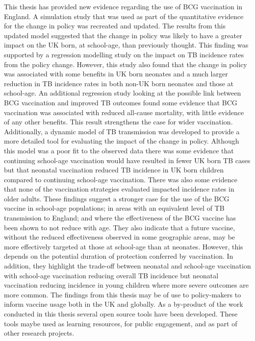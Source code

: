 \documentclass[11pt,twoside]{bristolthesis}
\begin{document}
  This thesis has provided new evidence regarding the use of BCG vaccination in England. A simulation study that was used as part of the quantitative evidence for the change in policy was recreated and updated. The results from this updated model suggested that the change in policy was likely to have a greater impact on the UK born, at school-age, than previously thought. This finding was supported by a regression modelling study on the impact on TB incidence rates from the policy change. However, this study also found that the change in policy was associated with some benefits in UK born neonates and a much larger reduction in TB incidence rates in both non-UK born neonates and those at school-age. An additional regression study looking at the possible link between BCG vaccination and improved TB outcomes found some evidence that BCG vaccination was associated with reduced all-cause mortality, with little evidence of any other benefits. This result strengthens the case for wider vaccination. Additionally, a dynamic model of TB transmission was developed to provide a more detailed tool for evaluating the impact of the change in policy. Although this model was a poor fit to the observed data there was some evidence that continuing school-age vaccination would have resulted in fewer UK born TB cases but that neonatal vaccination reduced TB incidence in UK born children compared to continuing school-age vaccination. There was also some evidence that none of the vaccination strategies evaluated impacted incidence rates in older adults. These findings suggest a stronger case for the use of the BCG vaccine in school-age populations; in areas with an equivalent level of TB transmission to England; and where the effectiveness of the BCG vaccine has been shown to not reduce with age. They also indicate that a future vaccine, without the reduced effectiveness observed in some geographic areas, may be more effectively targeted at those at school-age than at neonates. However, this depends on the potential duration of protection conferred by vaccination. In addition, they highlight the trade-off between neonatal and school-age vaccination with school-age vaccination reducing overall TB incidence but neonatal vaccination reducing incidence in young children where more severe outcomes are more common. The findings from this thesis may be of use to policy-makers to inform vaccine usage both in the UK and globally. As a by-product of the work conducted in this thesis several open source tools have been developed. These tools maybe used as learning resources, for public engagement, and as part of other research projects.
  
\end{document}
